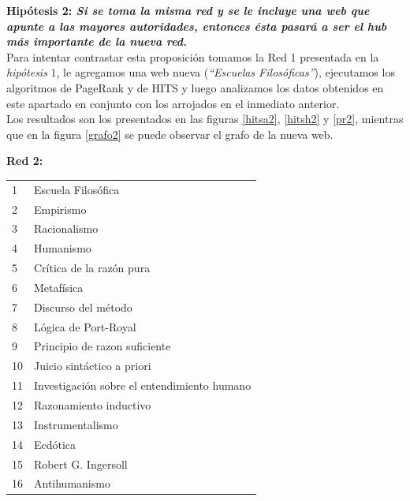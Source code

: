 \documentclass[a4paper]{article}
\begin{document}
\newpage

\textbf{Hipótesis 2: \itshape{Si se toma la misma red y se le incluye una web que apunte a las mayores autoridades, entonces ésta pasará a ser el hub más importante de la nueva red. }}\\

Para intentar contrastar esta proposición tomamos la Red 1 presentada en la \textit{hip\'otesis} $1$, le agregamos una web nueva (\textit{``Escuelas Filosóficas''}), ejecutamos los algoritmos de PageRank y de HITS y luego analizamos los datos obtenidos en este apartado en conjunto con los arrojados en el inmediato anterior.\\

Los resultados son los presentados en las figuras \ref{hitsa2}, \ref{hitsh2} y \ref{pr2}, mientras que en la figura \ref{grafo2} se puede observar el grafo de la nueva web.

\textbf{Red 2:}\\

\begin{tabular}{l l}
1 & Escuela Filosófica \\
2 & Empirismo \\
3 & Racionalismo \\
4 & Humanismo \\
5 & Crítica de la razón pura \\
6 & Metafísica \\
7 & Discurso del método \\
8 & Lógica de Port-Royal \\
9 & Principio de razon suficiente \\
10 & Juicio sintáctico a priori \\
11 & Investigación sobre el entendimiento humano \\
12 & Razonamiento inductivo \\
13 & Instrumentalismo \\
14 & Ecdótica \\
15 & Robert G. Ingersoll \\
16 & Antihumanismo \\
\end{tabular}
\end{document}
